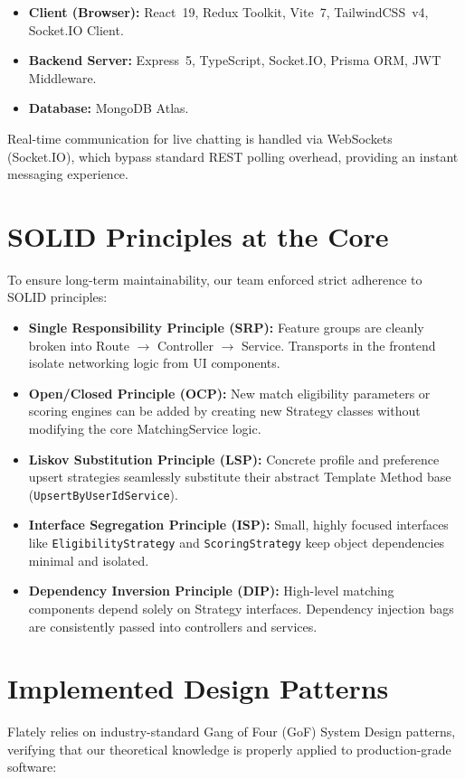 \documentclass[12pt,a4paper]{article}
\begin{document}
\begin{itemize}[leftmargin=*]
    \item \textbf{Client (Browser):} React~19, Redux Toolkit, Vite~7, TailwindCSS~v4, Socket.IO Client.
    \item \textbf{Backend Server:} Express~5, TypeScript, Socket.IO, Prisma ORM, JWT Middleware.
    \item \textbf{Database:} MongoDB Atlas.
\end{itemize}

Real-time communication for live chatting is handled via WebSockets (Socket.IO), which bypass standard REST polling overhead, providing an instant messaging experience.

\section{SOLID Principles at the Core}
To ensure long-term maintainability, our team enforced strict adherence to SOLID principles:
\begin{itemize}[leftmargin=*]
    \item \textbf{Single Responsibility Principle (SRP):} Feature groups are cleanly broken into Route $\rightarrow$ Controller $\rightarrow$ Service. Transports in the frontend isolate networking logic from UI components.
    \item \textbf{Open/Closed Principle (OCP):} New match eligibility parameters or scoring engines can be added by creating new Strategy classes without modifying the core MatchingService logic.
    \item \textbf{Liskov Substitution Principle (LSP):} Concrete profile and preference upsert strategies seamlessly substitute their abstract Template Method base (\texttt{UpsertByUserIdService}).
    \item \textbf{Interface Segregation Principle (ISP):} Small, highly focused interfaces like \texttt{EligibilityStrategy} and \texttt{ScoringStrategy} keep object dependencies minimal and isolated.
    \item \textbf{Dependency Inversion Principle (DIP):} High-level matching components depend solely on Strategy interfaces. Dependency injection bags are consistently passed into controllers and services.
\end{itemize}

\section{Implemented Design Patterns}
Flately relies on industry-standard Gang of Four (GoF) System Design patterns, verifying that our theoretical knowledge is properly applied to production-grade software:
\end{document}
